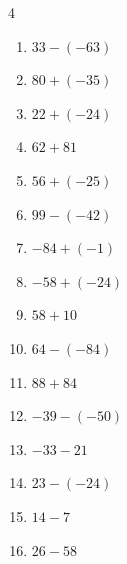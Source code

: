 \begin{multicols}{4}
\begin{enumerate}
  \item $33-(-63)$

        \phantom{$=96$}

\columnbreak %

  \item $80+(-35)$

        \phantom{$=45$}

  \item $22+(-24)$

        \phantom{$=-2$}

  \item $62+81$

        \phantom{$=143$}

  \item $56+(-25)$

        \phantom{$=31$}

  \item $99-(-42)$

        \phantom{$=141$}

  \item $-84+(-1)$

        \phantom{$=-85$}

  \item $-58+(-24)$

        \phantom{$=-82$}

  \item $58+10$

        \phantom{$=68$}

  \item $64-(-84)$

        \phantom{$=148$}

  \item $88+84$

        \phantom{$=172$}

  \item $-39-(-50)$

        \phantom{$=11$}

  \item $-33-21$

        \phantom{$=-54$}

  \item $23-(-24)$

        \phantom{$=47$}

  \item $14-7$

        \phantom{$=7$}

  \item $26-58$


\end{enumerate}
\end{multicols}
